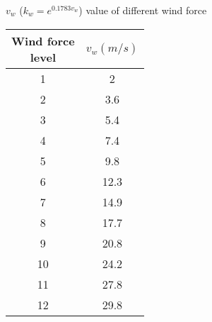\begin{center}
    \begin{threeparttable}
        \caption{$v_w$ ($k_w = e^{0.1783v_w}$) value of different wind force}
        \begin{tabular}{cc}
            \hline
            \thead{Wind force\\ leve}l & $v_w(m/s)$\\
            \hline
            1 & 2 \\
            2 & 3.6\\
            3 & 5.4\\
            4 & 7.4\\
            5 & 9.8\\
            6 & 12.3\\
            7 & 14.9\\
            8 & 17.7\\
            9 & 20.8\\
            10 & 24.2\\
            11 & 27.8\\
            12 & 29.8\\
            \hline
        \end{tabular}
        \label{tab:vw}
    \end{threeparttable}

\end{center}


